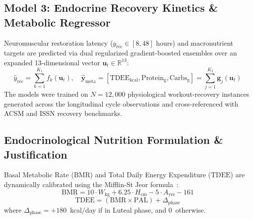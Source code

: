 \documentclass[conference]{IEEEtran}
\begin{document}
\subsection{Model 3: Endocrine Recovery Kinetics \& Metabolic Regressor}
Neuromuscular restoration latency ($y_{\text{rec}} \in [8, 48]$ hours) and macronutrient targets are predicted via dual regularized gradient-boosted ensembles over an expanded 13-dimensional vector $\mathbf{u}_t \in \mathbb{R}^{13}$:
\begin{equation}
\hat{y}_{\text{rec}} = \sum_{k=1}^{K_1} f_k(\mathbf{u}_t), \quad \hat{\mathbf{y}}_{\text{meta}} = [\text{TDEE}_{\text{kcal}}, \text{Protein}_{\text{g}}, \text{Carbs}_{\text{g}}] = \sum_{j=1}^{K_2} \mathbf{g}_j(\mathbf{u}_t)
\end{equation}
The models were trained on $N = 12{,}000$ physiological workout-recovery instances generated across the longitudinal cycle observations and cross-referenced with ACSM and ISSN recovery benchmarks.

\subsection{Endocrinological Nutrition Formulation \& Justification}
Basal Metabolic Rate ($\text{BMR}$) and Total Daily Energy Expenditure ($\text{TDEE}$) are dynamically calibrated using the Mifflin-St Jeor formula~\cite{mifflin1990}:
\begin{equation}
\text{BMR} = 10 \cdot W_{\text{kg}} + 6.25 \cdot H_{\text{cm}} - 5 \cdot A_{\text{yrs}} - 161
\end{equation}
\begin{equation}
\text{TDEE} = (\text{BMR} \times \text{PAL}) + \Delta_{\text{phase}}
\end{equation}
where $\Delta_{\text{phase}} = +180$~kcal/day if in Luteal phase, and $0$~otherwise.
\end{document}
